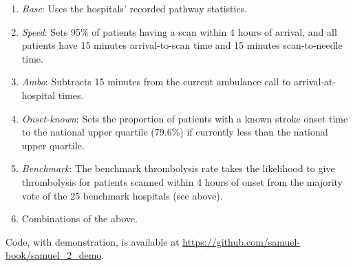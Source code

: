 \begin{enumerate}

    \item \textit{Base}: Uses the hospitals’ recorded pathway statistics.

    \item \textit{Speed}: Sets 95\% of patients having a scan within 4 hours of arrival, and all patients have 15 minutes arrival-to-scan time and 15 minutes scan-to-needle time.

    \item \textit{Ambo}: Subtracts 15 minutes from the current ambulance call to arrival-at-hospital times.

    \item  \textit{Onset-known}: Sets the proportion of patients with a known stroke onset time to the national upper quartile (79.6\%) if currently less than the national upper quartile.

    \item \textit{Benchmark}: The benchmark thrombolysis rate takes the likelihood to give thrombolysis for patients scanned within 4 hours of onset from the majority vote of the 25 benchmark hospitals (see above).

    \item Combinations of the above.
    
\end{enumerate}

Code, with demonstration, is available at \url{https://github.com/samuel-book/samuel_2_demo}.
